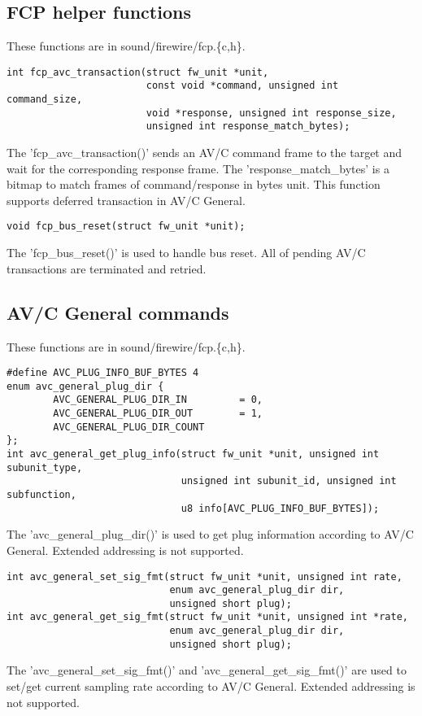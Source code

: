 \documentclass[onecolumn]{article}
\begin{document}
\subsection{FCP helper functions}

These functions are in sound/firewire/fcp.\{c,h\}.

\begin{verbatim}
int fcp_avc_transaction(struct fw_unit *unit,
                        const void *command, unsigned int command_size,
                        void *response, unsigned int response_size,
                        unsigned int response_match_bytes);
\end{verbatim}

The 'fcp\_avc\_transaction()' sends an AV/C command frame to the target and wait for the corresponding response frame. The 'response\_match\_bytes' is a bitmap to match frames of command/response in bytes unit. This function supports deferred transaction in AV/C General\cite{avc-general-4-2}.

\begin{verbatim}
void fcp_bus_reset(struct fw_unit *unit);
\end{verbatim}

The 'fcp\_bus\_reset()' is used to handle bus reset. All of pending AV/C transactions are terminated and retried. 


\subsection{AV/C General commands}

These functions are in sound/firewire/fcp.\{c,h\}.

\begin{verbatim}
#define AVC_PLUG_INFO_BUF_BYTES 4
enum avc_general_plug_dir {
        AVC_GENERAL_PLUG_DIR_IN         = 0,
        AVC_GENERAL_PLUG_DIR_OUT        = 1,
        AVC_GENERAL_PLUG_DIR_COUNT
};
int avc_general_get_plug_info(struct fw_unit *unit, unsigned int subunit_type,
                              unsigned int subunit_id, unsigned int subfunction,
                              u8 info[AVC_PLUG_INFO_BUF_BYTES]);
\end{verbatim}

The 'avc\_general\_plug\_dir()' is used to get plug information according to AV/C General\cite{avc-general-4-2}. Extended addressing is not supported.

\begin{verbatim}
int avc_general_set_sig_fmt(struct fw_unit *unit, unsigned int rate,
                            enum avc_general_plug_dir dir,
                            unsigned short plug);
int avc_general_get_sig_fmt(struct fw_unit *unit, unsigned int *rate,
                            enum avc_general_plug_dir dir,
                            unsigned short plug);
\end{verbatim}

The 'avc\_general\_set\_sig\_fmt()' and 'avc\_general\_get\_sig\_fmt()' are used to set/get current sampling rate according to AV/C General\cite{avc-general-4-2}. Extended addressing is not supported.
\end{document}
